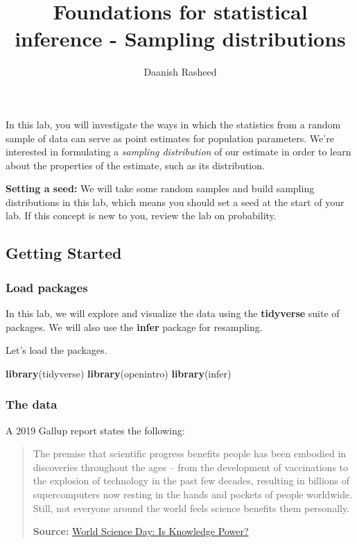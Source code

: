 \documentclass[
]{article}
\title{Foundations for statistical inference - Sampling distributions}
\author{Daanish Rasheed}
\date{}
\newenvironment{Shaded}{\begin{snugshade}}{\end{snugshade}}
\newcommand{\FunctionTok}[1]{\textcolor[rgb]{0.13,0.29,0.53}{\textbf{#1}}}
\newcommand{\NormalTok}[1]{#1}
\begin{document}
\maketitle

In this lab, you will investigate the ways in which the statistics from
a random sample of data can serve as point estimates for population
parameters. We're interested in formulating a \emph{sampling
distribution} of our estimate in order to learn about the properties of
the estimate, such as its distribution.

\protect{}\label{boxedtext}
\textbf{Setting a seed:} We will take some random samples and build
sampling distributions in this lab, which means you should set a seed at
the start of your lab. If this concept is new to you, review the lab on
probability.

\subsection{Getting Started}\label{getting-started}

\subsubsection{Load packages}\label{load-packages}

In this lab, we will explore and visualize the data using the
\textbf{tidyverse} suite of packages. We will also use the
\textbf{infer} package for resampling.

Let's load the packages.

\begin{Shaded}
\begin{Highlighting}[]
\FunctionTok{library}\NormalTok{(tidyverse)}
\FunctionTok{library}\NormalTok{(openintro)}
\FunctionTok{library}\NormalTok{(infer)}
\end{Highlighting}
\end{Shaded}

\subsubsection{The data}\label{the-data}

A 2019 Gallup report states the following:

\begin{quote}
The premise that scientific progress benefits people has been embodied
in discoveries throughout the ages -- from the development of
vaccinations to the explosion of technology in the past few decades,
resulting in billions of supercomputers now resting in the hands and
pockets of people worldwide. Still, not everyone around the world feels
science benefits them personally.

\textbf{Source:}
\href{https://news.gallup.com/opinion/gallup/268121/world-science-day-knowledge-power.aspx}{World
Science Day: Is Knowledge Power?}
\end{quote}
\end{document}
